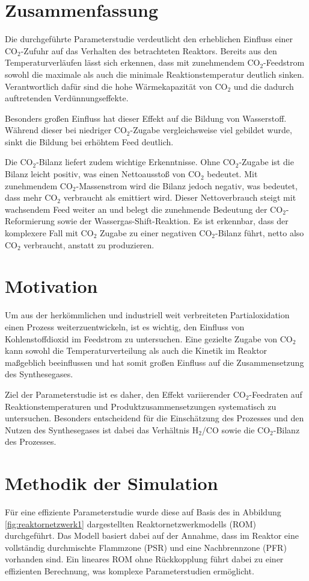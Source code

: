     \section{Zusammenfassung}
    Die durchgeführte Parameterstudie verdeutlicht den erheblichen Einfluss einer CO$_2$-Zufuhr auf das Verhalten des betrachteten Reaktors. Bereits aus den Temperaturverläufen lässt sich erkennen, dass mit zunehmendem CO$_2$-Feedstrom sowohl die maximale als auch die minimale Reaktionstemperatur deutlich sinken. Verantwortlich dafür sind die hohe Wärmekapazität von CO$_2$ und die dadurch auftretenden Verdünnungseffekte. 

    Besonders großen Einfluss hat dieser Effekt auf die Bildung von Wasserstoff. Während dieser bei niedriger CO$_2$-Zugabe vergleichsweise viel gebildet wurde, sinkt die Bildung bei erhöhtem Feed deutlich. 

    Die CO$_2$-Bilanz liefert zudem wichtige Erkenntnisse. Ohne CO$_2$-Zugabe ist die Bilanz leicht positiv, was einen Nettoausstoß von CO$_2$ bedeutet. Mit zunehmendem CO$_2$-Massenstrom wird die Bilanz jedoch negativ, was bedeutet, dass mehr CO$_2$ verbraucht als emittiert wird. Dieser Nettoverbrauch steigt mit wachsendem Feed weiter an und belegt die zunehmende Bedeutung der CO$_2$-Reformierung sowie der Wassergas-Shift-Reaktion. Es ist erkennbar, dass der komplexere Fall mit CO$_2$ Zugabe zu einer negativen CO$_2$-Bilanz führt, netto also CO$_2$ verbraucht, anstatt zu produzieren. 
\fi 
    \section{Motivation}
        Um aus der herkömmlichen und industriell weit verbreiteten Partialoxidation einen Prozess weiterzuentwickeln, ist es wichtig, den Einfluss von Kohlenstoffdioxid im Feedstrom zu untersuchen. Eine gezielte Zugabe von CO$_2$ kann sowohl die Temperaturverteilung als auch die Kinetik im Reaktor maßgeblich beeinflussen und hat somit großen Einfluss auf die Zusammensetzung des Synthesegases. 

        Ziel der Parameterstudie ist es daher, den Effekt variierender CO$_2$-Feedraten auf Reaktionstemperaturen und Produktzusammensetzungen systematisch zu untersuchen. Besonders entscheidend für die Einschätzung des Prozesses und den Nutzen des Synthesegases ist dabei das Verhältnis H$_2$/CO sowie die CO$_2$-Bilanz des Prozesses. 
    \section{Methodik der Simulation}
        Für eine effiziente Parameterstudie wurde diese auf Basis des in Abbildung \ref{fig:reaktornetzwerk1} dargestellten Reaktornetzwerkmodells (ROM) durchgeführt. Das Modell basiert dabei auf der Annahme, dass im Reaktor eine vollständig durchmischte Flammzone (PSR) und eine Nachbrennzone (PFR) vorhanden sind. Ein lineares ROM ohne Rückkopplung führt dabei zu einer effizienten Berechnung, was komplexe Parameterstudien ermöglicht. 

